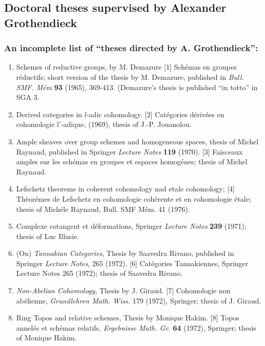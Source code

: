 \documentclass[12pt]{article}
\theoremstyle{plain}
\theoremstyle{definition}
\numberwithin{equation}{section}
\begin{document}
\subsection{Doctoral theses supervised by Alexander Grothendieck}


\subsubsection{An incomplete list of ``theses directed by A. Grothendieck'':}

\begin{enumerate}
\item Schemes of reductive groups, by M. Demazure
[1] Sch\'emas en groupes r\'eductifs; short version of the thesis by M. Demazure, published in 
\emph{Bull. SMF. M\'em} {\bf 93} (1965), 369-413. (Demazure's thesis is published ``in totto'' in SGA 3.
\item Derived categories in $l$-adic cohomology.
[2] Cat\'egories d\'eriv\'ees en cohomologie l'-adique, (1969), thesis of J.-P.
Jouanolou.
\item Ample sheaves over group schemes and homogeneous spaces, thesis of Michel
Raynaud, published in Springer \emph{Lecture Notes} {\bf119} (1970).
[3] Faisceaux amples sur les sch\'emas en groupes et espaces homog\'enes; thesis of Michel
Raynaud.
\item Lefschetz theorems in coherent cohomology nad etale cohomology;
[4] Th\`eor\'emes de Lefschetz en cohomologie coh\'erente et en cohomologie \'etale; thesis of
Mich\'ele Raynaud, Bull. SMF M\'em. 41 (1976).
\item Complexe cotangent et d\'eformations, Springer \emph{Lecture Notes} {\bf 239} (1971); thesis of Luc
Illusie.
\item (On) \emph{Tannakian Categories}, Thesis by Saavedra Rivano, published in Springer 
\emph{Lecture Notes}, 265 (1972).
[6] Cat\'egories Tannakiennes, Springer Lecture Notes 265 (1972); thesis of Saavedra Rivano.
\item \emph{Non-Abelian Cohomology}, Thesis by J. Giraud.
[7] Cohomologie non ab\'elienne, \emph{Grundlehren Math. Wiss.} 179 (1972), Springer; thesis
of J. Giraud.
\item Ring Topos and relative schemes, Thesis by Monique Hakim.
[8] Topos annel\'es et sch\'emas relatifs, \emph{Ergebnisse Math. Gr.} {\bf 64} (1972), Springer; thesis
of Monique Hakim.

\end{enumerate}
\end{document}
